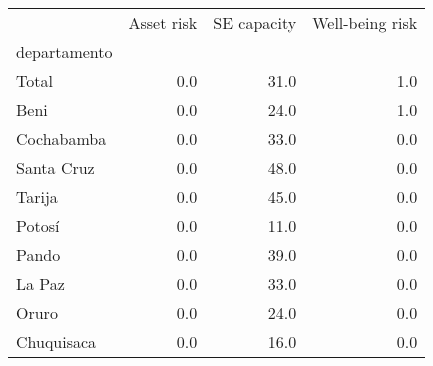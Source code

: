 \begin{tabular}{lrrr}
\toprule
{} &  Asset risk &  SE capacity &  Well-being risk \\
departamento &             &              &                  \\
\midrule
Total        &         0.0 &         31.0 &              1.0 \\
Beni         &         0.0 &         24.0 &              1.0 \\
Cochabamba   &         0.0 &         33.0 &              0.0 \\
Santa Cruz   &         0.0 &         48.0 &              0.0 \\
Tarija       &         0.0 &         45.0 &              0.0 \\
Potosí       &         0.0 &         11.0 &              0.0 \\
Pando        &         0.0 &         39.0 &              0.0 \\
La Paz       &         0.0 &         33.0 &              0.0 \\
Oruro        &         0.0 &         24.0 &              0.0 \\
Chuquisaca   &         0.0 &         16.0 &              0.0 \\
\bottomrule
\end{tabular}
